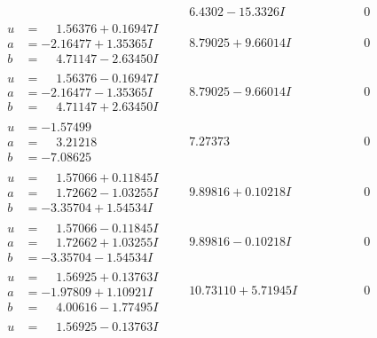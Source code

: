 \documentclass[1p]{elsarticle_modified}
\theoremstyle{definition}
\begin{document}
$$\begin{array}{c|c|c}
 & \phantom{-}6.4302 - 15.3326 I & \phantom{-0.000000 } 0 \\ \hline\begin{aligned}
u &= \phantom{-}1.56376 + 0.16947 I \\
a &= -2.16477 + 1.35365 I \\
b &= \phantom{-}4.71147 - 2.63450 I\end{aligned}
 & \phantom{-}8.79025 + 9.66014 I & \phantom{-0.000000 } 0 \\ \hline\begin{aligned}
u &= \phantom{-}1.56376 - 0.16947 I \\
a &= -2.16477 - 1.35365 I \\
b &= \phantom{-}4.71147 + 2.63450 I\end{aligned}
 & \phantom{-}8.79025 - 9.66014 I & \phantom{-0.000000 } 0 \\ \hline\begin{aligned}
u &= -1.57499\phantom{ +0.000000I} \\
a &= \phantom{-}3.21218\phantom{ +0.000000I} \\
b &= -7.08625\phantom{ +0.000000I}\end{aligned}
 & \phantom{-}7.27373\phantom{ +0.000000I} & \phantom{-0.000000 } 0 \\ \hline\begin{aligned}
u &= \phantom{-}1.57066 + 0.11845 I \\
a &= \phantom{-}1.72662 - 1.03255 I \\
b &= -3.35704 + 1.54534 I\end{aligned}
 & \phantom{-}9.89816 + 0.10218 I & \phantom{-0.000000 } 0 \\ \hline\begin{aligned}
u &= \phantom{-}1.57066 - 0.11845 I \\
a &= \phantom{-}1.72662 + 1.03255 I \\
b &= -3.35704 - 1.54534 I\end{aligned}
 & \phantom{-}9.89816 - 0.10218 I & \phantom{-0.000000 } 0 \\ \hline\begin{aligned}
u &= \phantom{-}1.56925 + 0.13763 I \\
a &= -1.97809 + 1.10921 I \\
b &= \phantom{-}4.00616 - 1.77495 I\end{aligned}
 & \phantom{-}10.73110 + 5.71945 I & \phantom{-0.000000 } 0 \\ \hline\begin{aligned}
u &= \phantom{-}1.56925 - 0.13763 I \\

\end{aligned}
\end{array}$$
\end{document}
